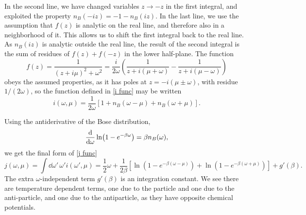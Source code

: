 In the second line, we have changed variables $z \rightarrow -z$ in the first integral, and exploited the property $n_B(-i z) = -1 - n_B(iz)$.
In the last line, we use the assumption that $f(z)$ is analytic on the real line, and therefore also in a neighborhood of it. 
This allows us to shift the first integral back to the real line.
As $n_B(iz)$ is analytic outside the real line, the result of the second integral is the sum of residues of $f(z) + f(-z)$ in the lower half-plane.
The function
\begin{equation}
    f(z) = \frac{1}{(z + i \mu)^2 + \omega^2} 
    = \frac{i}{2 \omega } 
    \left(
        \frac{1}{z + i(\mu + \omega)} - \frac{1}{z + i(\mu - \omega)}
    \right)
\end{equation}
obeys the assumed properties, as it has poles at
$z = - i (\mu \pm \omega)$, with residue $1 /( 2 \omega)$, so the function defined in \autoref{i func} may be written
\begin{equation}
    i(\omega, \mu) 
    = \frac{1}{2\omega}
    [1 + n_B(\omega - \mu) + n_B(\omega + \mu)].
\end{equation}

Using the antiderivative of the Bose distribution,
\begin{equation}
    \dv{\omega} \ln(1 - e^{-\beta \omega}) = \beta n_B(\omega),
\end{equation}
we get the final form of \autoref{j func}
\begin{equation}
    j(\omega, \mu) = \int \dd \omega'\, \omega' i(\omega', \mu)
    =  
    \frac{1}{2}\omega + \frac{1}{2\beta} 
    \left[
        \ln\left(1 - e^{-\beta(\omega - \mu)}\right)
        + \ln\left(1 - e^{-\beta(\omega + \mu)}\right)
    \right]
    + g'(\beta).
\end{equation}
The extra $\omega$-independent term $g'(\beta)$ is an integration constant.
We see there are temperature dependent terms, one due to the particle and one due to the anti-particle, and one due to the antiparticle, as they have opposite chemical potentials.

